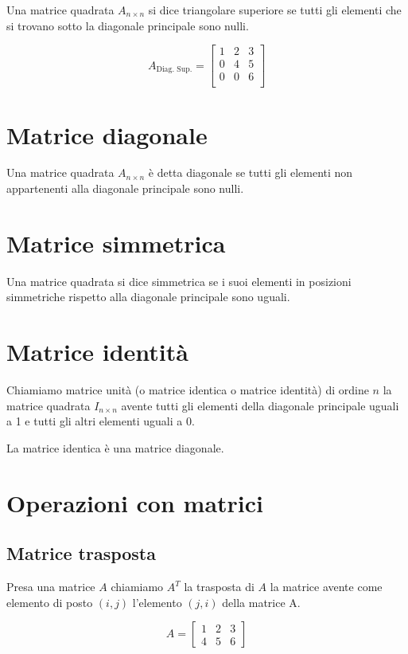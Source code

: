 Una matrice quadrata $A_{n\times n}$ si dice triangolare superiore se tutti gli elementi che si trovano sotto la diagonale principale sono nulli.

\[
A_{\text{Diag. Sup.}} =
\begin{bmatrix}
    1 & 2 & 3 \\
    0 & 4 & 5 \\
    0 & 0 & 6 \\
\end{bmatrix}
\]

\section{Matrice diagonale}

Una matrice quadrata $A_{n \times n}$ è detta diagonale se tutti gli elementi non appartenenti alla diagonale principale sono nulli.

\section{Matrice simmetrica}

Una matrice quadrata si dice simmetrica se i suoi elementi in posizioni simmetriche rispetto alla diagonale principale sono uguali.

\section{Matrice identità}

Chiamiamo matrice unità (o matrice identica o matrice identità) di ordine $n$ la matrice quadrata $I_{n \times n}$ avente tutti gli elementi della diagonale principale uguali a 1 e tutti gli altri elementi uguali a 0.

La matrice identica è una matrice diagonale.

\section{Operazioni con matrici}

\subsection{Matrice trasposta}

Presa una matrice $A$ chiamiamo $A^T$ la trasposta di $A$ la
matrice avente come elemento di posto $(i, j)$ l'elemento $(j, i)$
della matrice A.

$$
A =
\begin{bmatrix}
    1 & 2 & 3\\
    4 & 5 & 6
\end{bmatrix}
$$


